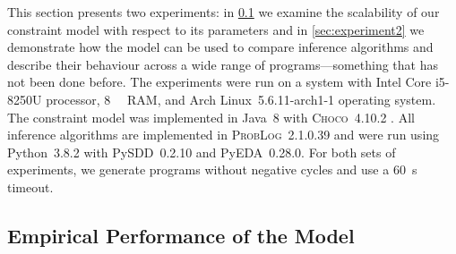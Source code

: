 \documentclass[runningheads]{llncs}
\begin{document}
This section presents two experiments: in \cref{sec:experiment1} we examine the
scalability of our constraint model with respect to its parameters and in
\cref{sec:experiment2} we demonstrate how the model can be used to compare
inference algorithms and describe their behaviour across a wide range of
programs---something that has not been done before. The experiments were run on
a system with Intel Core i5-8250U processor, \SI{8}{\giga\byte} RAM, and Arch
Linux~5.6.11-arch1-1 operating system. The constraint model was implemented in
Java~8 with \textsc{Choco}~4.10.2 \cite{choco}. All inference algorithms are
implemented in \textsc{ProbLog}~2.1.0.39 and were run using Python~3.8.2 with
PySDD~0.2.10 and PyEDA~0.28.0. For both sets of experiments, we generate
programs without negative cycles and use a \SI{60}{\second} timeout.

\subsection{Empirical Performance of the Model} \label{sec:experiment1}
\end{document}
